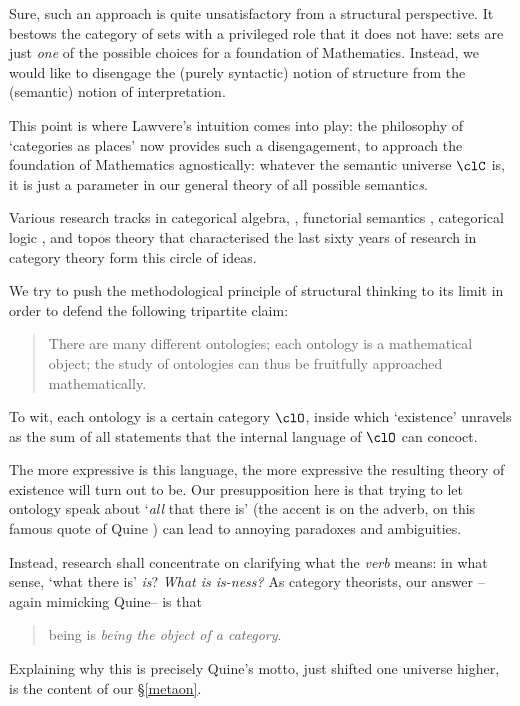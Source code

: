 Sure, such an approach is quite unsatisfactory from a structural perspective. It bestows the category of sets with a privileged role that it does not have: sets are just \emph{one} of the possible choices for a foundation of Mathematics. Instead, we would like to disengage the (purely syntactic) notion of structure from the (semantic) notion of interpretation.

This point is where Lawvere's intuition comes into play: the philosophy of `categories as places' now provides such a disengagement, to approach the foundation of Mathematics agnostically: whatever the semantic universe $\clC$ is, it is just a parameter in our general theory of all possible semantic\emph{s}.

Various research tracks in categorical algebra, \cite{Janelidze2004}, functorial semantics \cite{lawvere1963functorial,hyland2007category}, categorical logic \cite{lambek1988introduction}, and topos theory \cite{JohnstonePT} that characterised the last sixty years of research in category theory form this circle of ideas.

We try to push the methodological principle of structural thinking to its limit in order to defend the following tripartite claim:
\begin{quote}
  There are many different ontologies; each ontology is a mathematical object; the study of ontologies can thus be fruitfully approached mathematically.
\end{quote}
To wit, each ontology is a certain category $\clO$, inside which `existence' unravels as the sum of all statements that the internal language of $\clO$ can concoct.

The more expressive is this language, the more expressive the resulting theory of existence will turn out to be. Our presupposition here is that trying to let ontology speak about `\emph{all} that there is' (the accent is on the adverb, on this famous quote of Quine \cite{quine1948there}) can lead to annoying paradoxes and ambiguities.

Instead, research shall concentrate on clarifying what the \emph{verb} means: in what sense, `what there is' \emph{is}? \emph{What is is-ness?} As category theorists, our answer --again mimicking Quine-- is that
\begin{quote}
  being is \emph{being the object of a category}.
\end{quote}
Explaining why this is precisely Quine's motto, just shifted one universe higher, is the content of our §\ref{metaon}.
